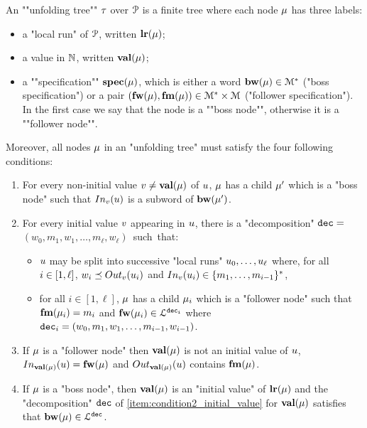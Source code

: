 \AP An ""unfolding tree"" $\tau$ over $\mathcal{P}$ is
a finite tree where each node $\mu$ has three labels:
\begin{itemize}
	\item a "local run" of $\mathcal{P}$, written $\mathbf{lr}(\mu)$;
	
	\item a value in $\mathbb{N}$, written $\mathbf{val}(\mu)$;
	
	\item a ""specification"" $\mathbf{spec}(\mu)$, which is either a word $\mathbf{bw}(\mu) \in \mathcal{M}^*$ ("boss specification") or a pair $(\mathbf{fw}(\mu), \mathbf{fm}(\mu)) \in \mathcal{M}^* \times \mathcal{M}$ ("follower specification"). In the first case we say that the node is a ""boss node"", otherwise it is a ""follower node"".
\end{itemize} 
Moreover, all nodes $\mu$ in an "unfolding tree" must satisfy the four following conditions:
\begin{enumerate}[label= (\roman*), ref=(\roman*)]
	\item \label{item:condition1_non_initial_value} For every non-initial value $v \ne \mathbf{val}(\mu)$ of $u$, $\mu$ has a child $\mu'$ which is a "boss node" such that $\vinput{\aval}{\localrun}$ is a subword of $\mathbf{bw}(\mu')$.
	
	\item \label{item:condition2_initial_value} For every initial value $v$ appearing in $u$, there is a "decomposition" $\mathtt{dec} =$ \\ $(w_0, m_1, w_1, \ldots, m_{\ell}, w_{\ell})$~such~that:
	\begin{itemize}
		\item $u$ may be split into successive "local runs" $u_0, \dots, u_{\ell}$ where, for all $i \in [1,\ell]$, $w_i \subword \voutput{\aval}{\localrun_i}$ and $\vinput{\aval}{\localrun_i} \in \set{m_1, \dots, m_{i-1}}^*$,
		\item for all $i \in [1,\ell]$, $\mu$ has a child $\mu_i$ which is a "follower node" such that $\mathbf{fm}(\mu_i) = m_i$ and $\mathbf{fw}(\mu_i) \in\mathcal{L}^{\mathtt{\mathtt{dec}_i}}$ where $\mathtt{dec}_i = (w_0, m_1, w_1, \ldots, m_{i-1}, w_{i-1})$.	\end{itemize}
	
	\item \label{item:condition3_follower_node} If $\mu$ is a "follower node" then $\mathbf{val}(\mu)$ is not an initial value of $u$, $\vinput{\valuelabel{\node}}{\localrun} = \followlabelword{\node}$ and 
	$\voutput{\valuelabel{\node}}{\localrun}$ contains $\mathbf{fm}(\mu)$.

	\item \label{item:condition4_boss_node} If $\mu$ is a "boss node", then $\mathbf{val}(\mu)$ is an "initial value" of $\mathbf{lr}(\mu)$ and the "decomposition" $\mathtt{dec}$ of \ref{item:condition2_initial_value} for $\mathbf{val}(\mu)$ satisfies that $\mathbf{bw}(\mu) \in \mathcal{L}^{\mathtt{\mathtt{dec}}}$.
\end{enumerate}

